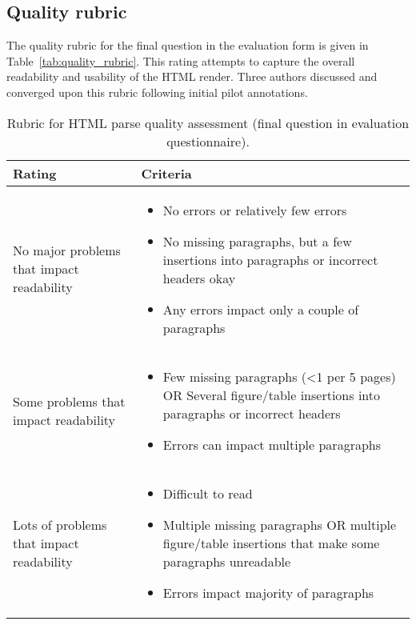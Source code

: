 \subsection{Quality rubric}
\label{app:quality_rubric}

The quality rubric for the final question in the evaluation form is given in Table~\ref{tab:quality_rubric}. This rating attempts to capture the overall readability and usability of the HTML render. Three authors discussed and converged upon this rubric following initial pilot annotations.

\begin{table}[h!]
    \small
    \centering
    \begin{tabular}{M{30mm}m{80mm}}
        \toprule
        Rating & Criteria \\
        \midrule
        No major problems that impact readability &
        \begin{itemize}[leftmargin=*]
            \item No errors or relatively few errors
            \item No missing paragraphs, but a few insertions into paragraphs or incorrect headers okay
            \item Any errors impact only a couple of paragraphs
        \end{itemize} \\
        \midrule
        Some problems that impact readability & 
        \begin{itemize}[leftmargin=*]
            \item Few missing paragraphs (<1 per 5 pages) OR Several figure/table insertions into paragraphs or incorrect headers
            \item Errors can impact multiple paragraphs
        \end{itemize} \\
        \midrule
        Lots of problems that impact readability & 
        \begin{itemize}[leftmargin=*]
            \item Difficult to read
            \item Multiple missing paragraphs OR multiple figure/table insertions that make some paragraphs unreadable
            \item Errors impact majority of paragraphs
        \end{itemize} \\
    \bottomrule
    \end{tabular}
    \caption{Rubric for HTML parse quality assessment (final question in evaluation questionnaire).}

\end{table}
